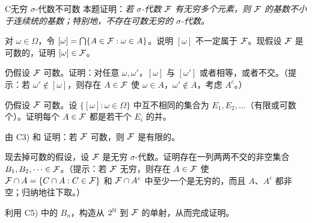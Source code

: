 \begin{probleme}{C}{无穷 $\sigma$-代数不可数}
本题证明：\emph{若 $\sigma$-代数 $\mathcal{F}$ 有无穷多个元素，则 $\mathcal{F}$ 的基数不小于连续统的基数；特别地，不存在可数无穷的 $\sigma$-代数。}
\begin{questions}
\item 对 $\omega\in\Omega$，令 $[\omega]=\bigcap\{A\in\mathcal{F}:\omega\in A\}$。说明 $[\omega]$ 不一定属于 $\mathcal{F}$。现假设 $\mathcal{F}$ 是可数的，证明 $[\omega]\in\mathcal{F}$。
\item 仍假设 $\mathcal{F}$ 可数。证明：对任意 $\omega,\omega'$，$[\omega]$ 与 $[\omega']$ 或者相等，或者不交。（提示：若 $\omega'\notin[\omega]$，则存在 $A\in\mathcal{F}$ 使 $\omega\in A$，$\omega'\notin A$，考虑 $A^c$。）
\item 仍假设 $\mathcal{F}$ 可数。设 $\{[\omega]:\omega\in\Omega\}$ 中互不相同的集合为 $E_1,E_2,\dots$（有限或可数个）。证明每个 $A\in\mathcal{F}$ 都是若干个 $E_i$ 的并。
\item 由 C3) 和 证明：若 $\mathcal{F}$ 可数，则 $\mathcal{F}$ 是有限的。
\item 现去掉可数的假设，设 $\mathcal{F}$ 是无穷 $\sigma$-代数。证明存在一列两两不交的非空集合 $B_1,B_2,\dots\in\mathcal{F}$。（提示：若 $\mathcal{F}$ 无穷，则存在 $A\in\mathcal{F}$ 使 $\mathcal{F}\cap A=\{C\cap A: C\in\mathcal{F}\}$ 和 $\mathcal{F}\cap A^c$ 中至少一个是无穷的，而且 $A$、$A^c$ 都非空；归纳地往下取。）
\item 利用 C5) 中的 $B_n$，构造从 $2^{\mathbb{N}}$ 到 $\mathcal{F}$ 的单射，从而完成证明。
\end{questions}
\end{probleme}

